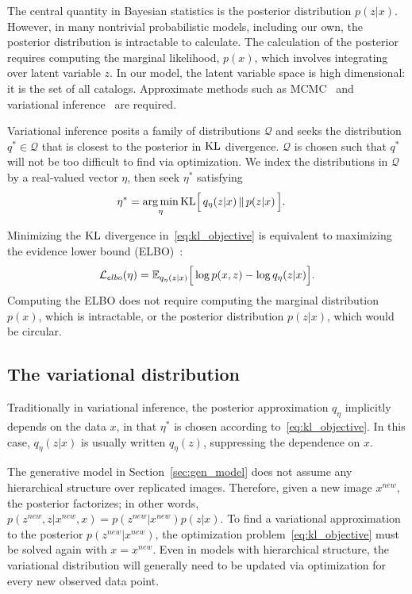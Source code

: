 The central quantity in Bayesian statistics is the posterior distribution $p(z|x)$.
However, in many
nontrivial probabilistic models, including our own, the posterior distribution is intractable to calculate.
The calculation of the posterior requires computing the marginal likelihood, $p(x)$, which involves integrating over latent variable $z$. 
In our model, the latent variable space is high dimensional: it is the set of all catalogs. Approximate methods such as MCMC~\cite{Portillo_2017} and variational inference~\cite{Blei_2017_vi_review, Jordan_intro_vi, Wainwrite_graph_models_vi} are required. 

Variational inference posits a family of distributions $\mathcal{Q}$ and seeks
the distribution $q^*\in \mathcal{Q}$ that is closest to the posterior
in $\textrm{KL}$ divergence. 
$\mathcal{Q}$ is chosen such that $q^*$ will not be too difficult to find via optimization. 
We index the distributions in $\mathcal{Q}$ by a real-valued vector $\eta$, then seek $\eta^*$ satisfying
\begin{align}
   \eta^* &= \operatorname*{arg\,min}_{\eta} \mathrm{KL}\Big[\,q_\eta(z | x)\, \| \,p(z | x)\,\Big].
   \label{eq:kl_objective}
\end{align}

Minimizing the $\textrm{KL}$ divergence in~\eqref{eq:kl_objective} is equivalent to maximizing the evidence lower bound (ELBO)~\cite{Blei_2017_vi_review}:
\begin{align}
    \mathcal{L}_{elbo}(\eta) = 
    \mathbb{E}_{q_\eta(z | x)}\Big[\log p(x, z) - \log q_\eta(z | x)\Big].
    \label{eq:elbo}
\end{align}
Computing the ELBO does not require computing the marginal distribution $p(x)$, which is intractable, or the posterior distribution $p(z | x)$, which would be circular. 

\subsection{The variational distribution}
\label{sec:var_distr}
Traditionally in variational inference, the posterior approximation 
$q_\eta$ implicitly depends on the data $x$, 
in that $\eta^*$ is chosen according to~\eqref{eq:kl_objective}.
In this case, $q_\eta(z | x)$ is usually written $q_\eta(z)$, suppressing the dependence on $x$.

The generative model in Section~\ref{sec:gen_model} does not assume any hierarchical structure over replicated  images. Therefore, given a new image $x^{new}$, the posterior factorizes; in other words,
$p(z^{new}, z | x^{new}, x) = p(z^{new} | x^{new}) p(z | x)$. 
To find a variational  approximation to the posterior $p(z^{new} | x^{new})$, the optimization problem~\eqref{eq:kl_objective} must be solved again with $x = x^{new}$.
Even in models with hierarchical structure, the variational distribution will generally need to be updated via optimization for every new observed data point. 

